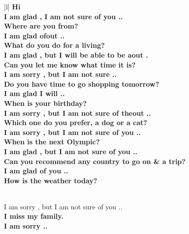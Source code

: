 \documentclass[11pt,a4paper]{article}
\begin{document}
\begin{table}[t!]
\begin{center}
\begin{tabular}{|l|}
\hline \bf 
Hi  \\ 
I am glad , I am not sure of you ..\\
\bf Where are you from?  
\\I am glad ofout ..
\\ \bf What do you do for a living?
 \\ I am glad , but I will be able to be aout .
\\ \bf Can you let me know what time it is?
 \\I am sorry , but I am not sure ..
 \\ \bf Do you have time to go shopping tomorrow?
 \\  I am glad I will ..
 \\
\bf When is your birthday? \\  
I am sorry , but I am not sure of theout .. \\
\bf Which one do you prefer, a dog or a cat?
\\I am sorry , but I am not sure of you .. \\
\bf When is the next Olympic?
 \\  I am glad , but I am not sure of you ..
 \\
\bf Can you recommend any country to go on & \bf  a trip? 
\\ I am glad of you ..
  \\
\bf How is the weather today?
 
 
 \\  I am sorry , but I am not sure of you ..
  \\
\bf I miss my family.
 \\  I am sorry ..
 \\
\hline
\end{tabular}
\end{center}
\caption{the input and output of chat bot trained with Daily dialogue, 5 epoch. Underfitting result: training error larger than validation error}
\end{table}
\end{document}
